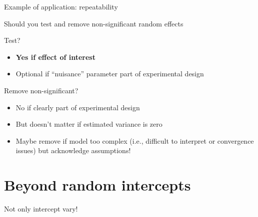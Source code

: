 \documentclass{beamer}
\begin{document}
\begin{frame}{Example of application: repeatability}
 
\end{frame}

\begin{frame}{Should you test and remove non-significant random effects}
 
 \begin{block}{Test?}
    \begin{itemize}
     \item \textbf{Yes if effect of interest}
     \item Optional if ``nuisance'' parameter part of experimental design
    \end{itemize}
\end{block}
\pause
 \begin{block}{Remove non-significant?}
    \begin{itemize}
     \item No if clearly part of experimental design
     \item But doesn't matter if estimated variance is zero
     \item Maybe remove if model too complex (i.e., difficult to interpret or convergence issues) but acknowledge assumptions!
    \end{itemize}
\end{block}
 
\end{frame}


\section{Beyond random intercepts}

\begin{frame}{Not only intercept vary!}
\centering
\end{frame}
\end{document}
